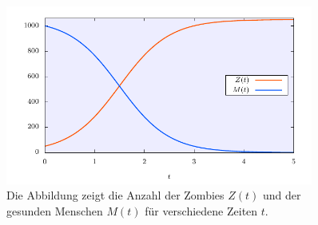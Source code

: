 \begin{atiSolution}
\begin{figure}[H]
		\center
		\atiPoints[2]
		\includegraphics[width=0.9\textwidth]{task-eine_zombieapokalypse-diagram}
		\caption{Die Abbildung zeigt die Anzahl der Zombies $Z(t)$ und der gesunden Menschen $M(t)$ für verschiedene Zeiten $t$.}
	\end{figure}
\end{atiSolution}